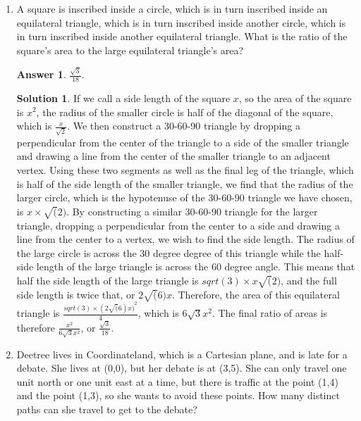 \documentclass[11pt]{article}
\theoremstyle{definition}
\newtheorem*{solution}{Solution}
\newtheorem*{answer}{Answer}
\begin{document}
\begin{enumerate}
\item A square is inscribed inside a circle, which is in turn inscribed inside an equilateral triangle, which is in turn inscribed inside another circle, which is in turn inscribed inside another equilateral triangle. What is the ratio of the square's area to the large equilateral triangle's area?

\begin{answer}
$\frac{\sqrt{3}}{18}$.
\end{answer}
\begin{solution}
If we call a side length of the square $x$, so the area of the square is $x^2$, the radius of the smaller circle is half of the diagonal of the square, which is $\frac{x}{\sqrt{2}}$. We then construct a 30-60-90 triangle by dropping a perpendicular from the center of the triangle to a side of the smaller triangle and drawing a line from the center of the smaller triangle to an adjacent vertex. Using these two segments as well as the final leg of the triangle, which is half of the side length of the smaller triangle, we find that the radius of the larger circle, which is the hypotenuse of the 30-60-90 triangle we have chosen, is $x\times \sqrt(2)$. By constructing a similar 30-60-90 triangle for the larger triangle, dropping a perpendicular from the center to a side and drawing a line from the center to a vertex, we wish to find the side length. The radius of the large circle is across the 30 degree degree of this triangle while the half-side length of the large triangle is across the 60 degree angle. This means that half the side length of the large triangle is $sqrt(3) \times x\sqrt(2)$, and the full side length is twice that, or $2\sqrt(6)x$. Therefore, the area of this equilateral triangle is $\frac{sqrt(3)\times{(2\sqrt(6)x)}^2}{4}$, which is $6\sqrt{3}{x}^2$. The final ratio of areas is therefore $\frac{x^2}{6\sqrt{3}{x}^2}$, or $\boxed{\frac{\sqrt{3}}{18}}$.
\end{solution}

\item Deetree lives in Coordinateland, which is a Cartesian plane, and is late for a debate. She lives at (0,0), but her debate is at (3,5). She can only travel one unit north or one unit east at a time, but there is traffic at the point (1,4) and the point (1,3), so she wants to avoid these points. How many distinct paths can she travel to get to the debate?


\end{enumerate}
\end{document}
